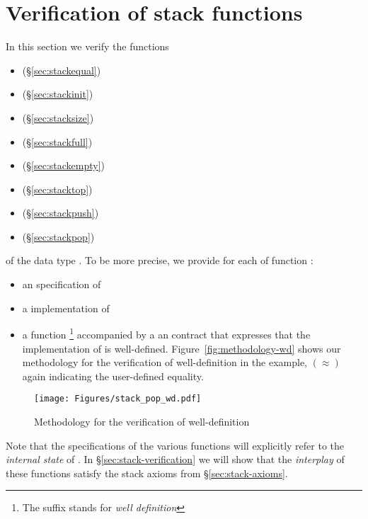 
\section{Verification of stack functions}

In this section we verify the functions
\begin{itemize}
\item \stackequal (\S\ref{sec:stackequal})
\item \stackinit (\S\ref{sec:stackinit})
\item \stacksize (\S\ref{sec:stacksize})
\item \stackfull (\S\ref{sec:stackfull})
\item \stackempty (\S\ref{sec:stackempty}) 
\item \stacktop (\S\ref{sec:stacktop})
\item \stackpush (\S\ref{sec:stackpush})
\item \stackpop (\S\ref{sec:stackpop})
\end{itemize}

of the data type \stacktype.
To be more precise, we provide for each of function :
\begin{itemize}
\item an \acsl specification of  
\item a \isoc implementation of 
\item a \isoc function \footnote{
  The suffix  stands for \emph{well definition}
}
accompanied by a an \acsl contract that expresses that
the implementation of  is well-defined.
Figure~\ref{fig:methodology-wd}
shows our methodology for the verification of
well-definition in the  example,
$(\approx)$ again indicating the user-defined \stacktype equality.
\end{itemize}

\begin{figure}[hbt]
\centering
\texttt{[image: Figures/stack\_pop\_wd.pdf]}
\caption{Methodology for the verification of well-definition}
\end{figure}

\FloatBarrier

Note that the specifications of the various functions will explicitly
refer to the \emph{internal state} of \stacktype.
In \S\ref{sec:stack-verification} we will show that the
\emph{interplay} of these functions satisfy the stack axioms from
\S\ref{sec:stack-axioms}.


\clearpage

\clearpage
\clearpage
\clearpage
\clearpage
\clearpage

\clearpage
\clearpage
\clearpage

